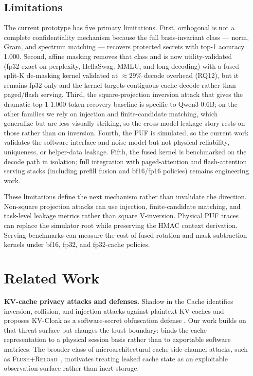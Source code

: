 \subsection{Limitations}

The current prototype has five primary limitations. First, orthogonal \sys{} is not a complete confidentiality mechanism because the full basis-invariant class --- norm, Gram, and spectrum matching --- recovers protected secrets with top-1 accuracy 1.000. Second, affine masking removes that class and is now utility-validated (fp32-exact on perplexity, HellaSwag, MMLU, and long decoding) with a fused split-K de-masking kernel validated at $\approx 29\%$ decode overhead (RQ12), but it remains fp32-only and the kernel targets contiguous-cache decode rather than paged/flash serving. Third, the square-projection inversion attack that gives the dramatic top-1 1.000 token-recovery baseline is specific to Qwen3-0.6B; on the other families we rely on injection and finite-candidate matching, which generalize but are less visually striking, so the cross-model leakage story rests on those rather than on inversion. Fourth, the PUF is simulated, so the current work validates the software interface and noise model but not physical reliability, uniqueness, or helper-data leakage. Fifth, the fused kernel is benchmarked on the decode path in isolation; full integration with paged-attention and flash-attention serving stacks (including prefill fusion and bf16/fp16 policies) remains engineering work.

These limitations define the next mechanism rather than invalidate the direction. Non-square projection attacks can use injection, finite-candidate matching, and task-level leakage metrics rather than square V-inversion. Physical PUF traces can replace the simulator root while preserving the HMAC context derivation. Serving benchmarks can measure the cost of fused rotation and mask-subtraction kernels under bf16, fp32, and fp32-cache policies.

\section{Related Work}
\label{sec:related}

\textbf{KV-cache privacy attacks and defenses.} Shadow in the Cache identifies inversion, collision, and injection attacks against plaintext KV-caches and proposes KV-Cloak as a software-secret obfuscation defense \cite{shadow_cache}. Our work builds on that threat surface but changes the trust boundary: \sys{} binds the cache representation to a physical session basis rather than to exportable software matrices. The broader class of microarchitectural cache side-channel attacks, such as \textsc{Flush+Reload}~\cite{flush_reload}, motivates treating leaked cache state as an exploitable observation surface rather than inert storage.

